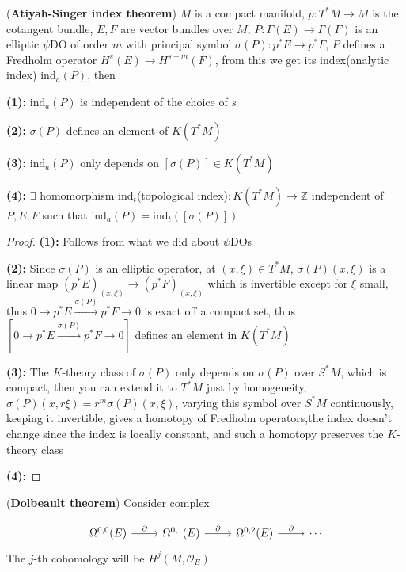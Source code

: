 \documentclass[../main.tex]{subfiles}
\begin{document}
\begin{theorem}(\textbf{Atiyah-Singer index theorem})\label{Atiyah-Singer index theorem}
$M$ is a compact manifold, $p: T^*M\to M$ is the cotangent bundle, $E,F$ are vector bundles over $M$, $P: \Gamma(E)\to \Gamma(F)$ is an elliptic $\psi$DO of order $m$ with principal symbol $\sigma(P): p^*E\to p^*F$, $P$ defines a Fredholm operator $H^s(E)\to H^{s-m}(F)$, from this we get its index(analytic index) $\mathrm{ind}_a(P)$, then \par
\textbf{(1): }$\mathrm{ind}_a(P)$ is independent of the choice of $s$ \par
\textbf{(2): }$\sigma(P)$ defines an element of $K(T^*M)$ \par
\textbf{(3): }$\mathrm{ind}_a(P)$ only depends on $[\sigma(P)]\in K(T^*M)$ \par
\textbf{(4): }$\exists$ homomorphism $\mathrm{ind}_t$(topological index)$:K(T^*M)\to \mathbb Z$ independent of $P,E,F$ such that $\mathrm{ind}_a(P)=\mathrm{ind}_t\left([\sigma(P)]\right)$
\end{theorem}

\begin{proof}
\textbf{(1): }Follows from what we did about $\psi$DOs \par
\textbf{(2): }Since $\sigma(P)$ is an elliptic operator, at $(x,\xi)\in T^*M$, $\sigma(P)(x,\xi)$ is a linear map $(p^*E)_{(x,\xi)}\to (p^*F)_{(x,\xi)}$ which is invertible except for $\xi$ small, thus $0\to p^*E\overset{\sigma(P)}{\longrightarrow}p^*F\to0$ is exact off a compact set, thus $\left[0\to p^*E\overset{\sigma(P)}{\longrightarrow}p^*F\to0\right]$ defines an element in $K(T^*M)$ \par
\textbf{(3): }The $K$-theory class of $\sigma(P)$ only depends on $\sigma(P)$ over $S^*M$, which is compact, then you can extend it to $T^*M$ just by homogeneity, $\sigma(P)(x,r\xi)=r^m\sigma(P)(x,\xi)$, varying this symbol over $S^*M$ continuously, keeping it invertible, gives a homotopy of Fredholm operators,the index doesn't change since the index is locally constant, and such a homotopy preserves the $K$-theory class \par
\textbf{(4): }
\end{proof}

\begin{theorem}(\textbf{Dolbeault theorem})\label{Dolbeault theorem}
Consider complex \par
\[
\begin{tikzcd}
{\Omega^{0,0}(E)} \arrow[r, "\bar\partial"] & {\Omega^{0,1}(E)} \arrow[r, "\bar\partial"] & {\Omega^{0,2}(E)} \arrow[r, "\bar\partial"] & {\cdots}
\end{tikzcd}
\]
The $j$-th cohomology will be $H^j(M,\mathcal{O}_E)$
\end{theorem}
\end{document}
